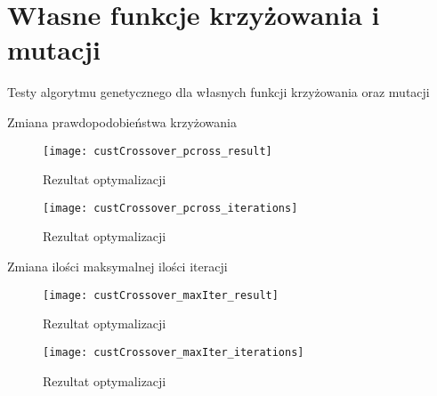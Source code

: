 \section{Własne funkcje krzyżowania i mutacji}

Testy algorytmu genetycznego dla własnych funkcji krzyżowania oraz mutacji

Zmiana prawdopodobieństwa krzyżowania

\begin{figure}[H]
	\centering
	\texttt{[image: custCrossover\_pcross\_result]}
	\caption{Rezultat optymalizacji}
	\label{rys:fftFiltry}
\end{figure}

\begin{figure}[H]
	\centering
	\texttt{[image: custCrossover\_pcross\_iterations]}
	\caption{Rezultat optymalizacji}
	\label{rys:fftFiltry}
\end{figure}


Zmiana ilości maksymalnej ilości iteracji

\begin{figure}[H]
	\centering
	\texttt{[image: custCrossover\_maxIter\_result]}
	\caption{Rezultat optymalizacji}
	\label{rys:fftFiltry}
\end{figure}

\begin{figure}[H]
	\centering
	\texttt{[image: custCrossover\_maxIter\_iterations]}
	\caption{Rezultat optymalizacji}
	\label{rys:fftFiltry}
\end{figure}